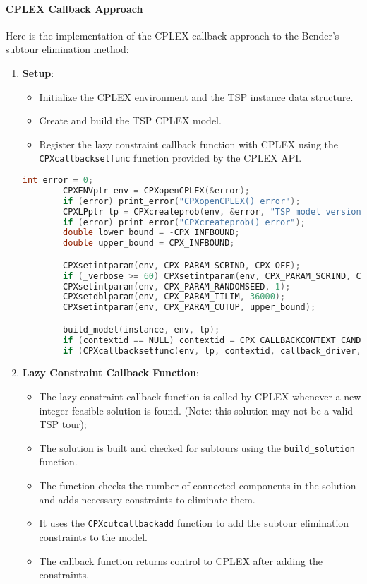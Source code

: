 \documentclass{article}
\begin{document}
\paragraph{CPLEX Callback Approach}
Here is the implementation of the CPLEX callback approach to the Bender's subtour elimination method:
\begin{enumerate}
	\item \textbf{Setup}:
	\begin{itemize}
		\item Initialize the CPLEX environment and the TSP instance data structure.
		\item Create and build the TSP CPLEX model.
		\item Register the lazy constraint callback function with CPLEX using the \texttt{CPXcallbacksetfunc} function provided by the CPLEX API.
	\end{itemize}
	\begin{lstlisting}[language=C]
		int error = 0;
		CPXENVptr env = CPXopenCPLEX(&error);
		if (error) print_error("CPXopenCPLEX() error");
		CPXLPptr lp = CPXcreateprob(env, &error, "TSP model version 1");
		if (error) print_error("CPXcreateprob() error");
		double lower_bound = -CPX_INFBOUND;
		double upper_bound = CPX_INFBOUND;

		CPXsetintparam(env, CPX_PARAM_SCRIND, CPX_OFF);
		if (_verbose >= 60) CPXsetintparam(env, CPX_PARAM_SCRIND, CPX_ON);
		CPXsetintparam(env, CPX_PARAM_RANDOMSEED, 1);
		CPXsetdblparam(env, CPX_PARAM_TILIM, 36000);
		CPXsetintparam(env, CPX_PARAM_CUTUP, upper_bound);

		build_model(instance, env, lp);
		if (contextid == NULL) contextid = CPX_CALLBACKCONTEXT_CANDIDATE;
		if (CPXcallbacksetfunc(env, lp, contextid, callback_driver, instance)) print_error("CPXcallbacksetfunc() error");
	\end{lstlisting}
	\item \textbf{Lazy Constraint Callback Function}:
	\begin{itemize}
		\item The lazy constraint callback function is called by CPLEX whenever a new integer feasible solution is found. (Note: this solution may not be a valid TSP tour);
		\item The solution is built and checked for subtours using the \texttt{build\_solution} function.
		\item The function checks the number of connected components in the solution and adds necessary constraints to eliminate them.
		\item It uses the \texttt{CPXcutcallbackadd} function to add the subtour elimination constraints to the model.
		\item The callback function returns control to CPLEX after adding the constraints.
	\end{itemize}
	\begin{lstlisting}[language=C]
		

\end{lstlisting}
\end{enumerate}
\end{document}
